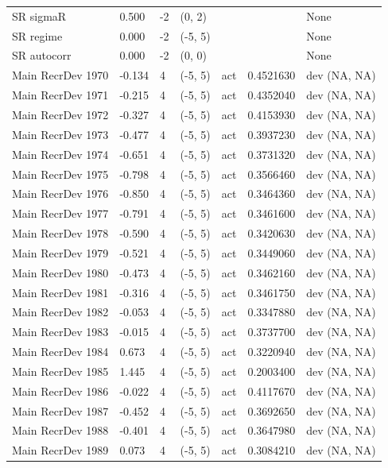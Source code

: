 \documentclass[11pt,
  english,
]{article}
\begin{document}
\begin{landscape}
\begin{longtable}[t]{lllllll}
SR sigmaR & 0.500 & -2 & (0, 2) &  &  & None\\
\addlinespace
SR regime & 0.000 & -2 & (-5, 5) &  &  & None\\
SR autocorr & 0.000 & -2 & (0, 0) &  &  & None\\
Main RecrDev 1970 & -0.134 & 4 & (-5, 5) & act & 0.4521630 & dev (NA, NA)\\
Main RecrDev 1971 & -0.215 & 4 & (-5, 5) & act & 0.4352040 & dev (NA, NA)\\
Main RecrDev 1972 & -0.327 & 4 & (-5, 5) & act & 0.4153930 & dev (NA, NA)\\
\addlinespace
Main RecrDev 1973 & -0.477 & 4 & (-5, 5) & act & 0.3937230 & dev (NA, NA)\\
Main RecrDev 1974 & -0.651 & 4 & (-5, 5) & act & 0.3731320 & dev (NA, NA)\\
Main RecrDev 1975 & -0.798 & 4 & (-5, 5) & act & 0.3566460 & dev (NA, NA)\\
Main RecrDev 1976 & -0.850 & 4 & (-5, 5) & act & 0.3464360 & dev (NA, NA)\\
Main RecrDev 1977 & -0.791 & 4 & (-5, 5) & act & 0.3461600 & dev (NA, NA)\\
\addlinespace
Main RecrDev 1978 & -0.590 & 4 & (-5, 5) & act & 0.3420630 & dev (NA, NA)\\
Main RecrDev 1979 & -0.521 & 4 & (-5, 5) & act & 0.3449060 & dev (NA, NA)\\
Main RecrDev 1980 & -0.473 & 4 & (-5, 5) & act & 0.3462160 & dev (NA, NA)\\
Main RecrDev 1981 & -0.316 & 4 & (-5, 5) & act & 0.3461750 & dev (NA, NA)\\
Main RecrDev 1982 & -0.053 & 4 & (-5, 5) & act & 0.3347880 & dev (NA, NA)\\
\addlinespace
Main RecrDev 1983 & -0.015 & 4 & (-5, 5) & act & 0.3737700 & dev (NA, NA)\\
Main RecrDev 1984 & 0.673 & 4 & (-5, 5) & act & 0.3220940 & dev (NA, NA)\\
Main RecrDev 1985 & 1.445 & 4 & (-5, 5) & act & 0.2003400 & dev (NA, NA)\\
Main RecrDev 1986 & -0.022 & 4 & (-5, 5) & act & 0.4117670 & dev (NA, NA)\\
Main RecrDev 1987 & -0.452 & 4 & (-5, 5) & act & 0.3692650 & dev (NA, NA)\\
\addlinespace
Main RecrDev 1988 & -0.401 & 4 & (-5, 5) & act & 0.3647980 & dev (NA, NA)\\
Main RecrDev 1989 & 0.073 & 4 & (-5, 5) & act & 0.3084210 & dev (NA, NA)\\

\end{longtable}
\end{landscape}
\end{document}
